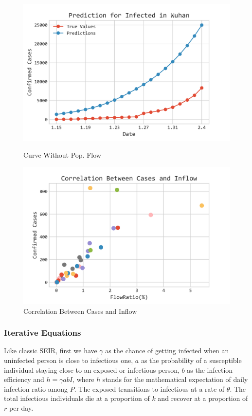 \documentclass[12pt]{mcmthesis}
\begin{document}
\begin{figure}[htbp]
    \centering
    \begin{minipage}[c]{0.48\textwidth}
        \includegraphics[width=1.0\textwidth]{figure/Wuhan_Naive.png}
        \caption{Curve Without Pop. Flow}
        \label{fig:noflow}
    \end{minipage}
    \begin{minipage}[c]{0.48\textwidth}
        \includegraphics[width=1.0\textwidth]{figure/Relation_Ana.png}
        \caption{Correlation Between Cases and Inflow}
        \label{fig:relation}
    \end{minipage}
\end{figure}

\subsubsection{Iterative Equations} \label{subsubSec:eqn}
Like classic SEIR, first we have $\gamma$ as the chance of getting infected when an uninfected person is close to infectious one, $a$ as the probability of a susceptible individual staying close to an exposed or infectious person, $b$ as the infection efficiency and $h=\gamma a b I$, where $h$ stands for the mathematical expectation of daily infection ratio among $P$. The exposed transitions to infectious at a rate of $\theta$. The total infectious individuals die at a proportion of $k$ and recover at a proportion of $r$ per day.
\end{document}
